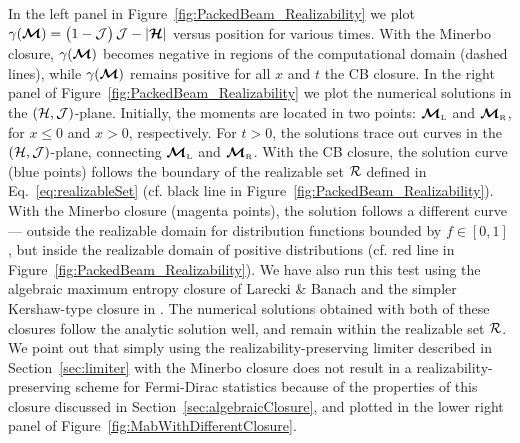 In the left panel in Figure~\ref{fig:PackedBeam_Realizability} we plot $\gamma(\boldsymbol{\mathcal{M}})=\big(1-\mathcal{J}\big)\,\mathcal{J}-|\boldsymbol{\mathcal{H}}|$ versus position for various times.  
With the Minerbo closure, $\gamma(\boldsymbol{\mathcal{M}})$ becomes negative in regions of the computational domain (dashed lines), while $\gamma(\boldsymbol{\mathcal{M}})$ remains positive for all $x$ and $t$ the CB closure.  
In the right panel of Figure~\ref{fig:PackedBeam_Realizability} we plot the numerical solutions in the $(\mathcal{H},\mathcal{J})$-plane.  
Initially, the moments are located in two points: $\boldsymbol{\mathcal{M}}_{\mbox{\tiny L}}$ and $\boldsymbol{\mathcal{M}}_{\mbox{\tiny R}}$, for $x\le0$ and $x>0$, respectively.  
For $t>0$, the solutions trace out curves in the $(\mathcal{H},\mathcal{J})$-plane, connecting $\boldsymbol{\mathcal{M}}_{\mbox{\tiny L}}$ and $\boldsymbol{\mathcal{M}}_{\mbox{\tiny R}}$.  
With the CB closure, the solution curve (blue points) follows the boundary of the realizable set $\mathcal{R}$ defined in Eq.~\eqref{eq:realizableSet} (cf. black line in Figure~\ref{fig:PackedBeam_Realizability}).  
With the Minerbo closure (magenta points), the solution follows a different curve --- outside the realizable domain for distribution functions bounded by $f\in[0,1]$, but inside the realizable domain of positive distributions (cf. red line in Figure~\ref{fig:PackedBeam_Realizability}).  
We have also run this test using the algebraic maximum entropy closure of Larecki \& Banach \cite{lareckiBanach_2011} and the simpler Kershaw-type closure in \cite{banachLarecki_2017a}.  
The numerical solutions obtained with both of these closures follow the analytic solution well, and remain within the realizable set $\mathcal{R}$.  
We point out that simply using the realizability-preserving limiter described in Section~\ref{sec:limiter} with the Minerbo closure does not result in a realizability-preserving scheme for Fermi-Dirac statistics because of the properties of this closure discussed in Section~\ref{sec:algebraicClosure}, and plotted in the lower right panel of Figure~\ref{fig:MabWithDifferentClosure}.  

